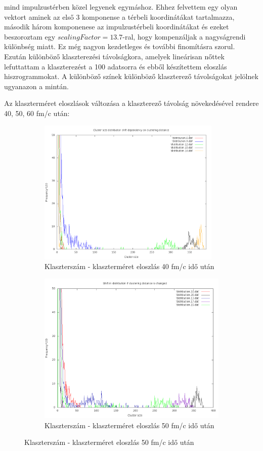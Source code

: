 \documentclass[a4paper,12pt]{article}
\begin{document}
mind impulzustérben közel legyenek egymáshoz. Ehhez felvettem egy olyan vektort aminek az első 3 komponense a térbeli koordinátákat tartalmazza,
második három komponenese az impulzustérbeli koordinátákat és ezeket beszoroztam egy $scalingFactor = 13.7$-ral, hogy kompenzáljak a nagyságrendi különbség
miatt. Ez még nagyon kezdetleges és további finomításra szorul. Ezután különböző klaszterezési távolságkora, amelyek lineárisan nőttek lefuttattam a klaszterezést a 100 adatsorra és ebből készítettem eloszlás
hiszrogrammokat. A különböző színek különböző klaszterező távolságokat jelölnek ugyanazon a mintán.
\par Az klaszterméret eloszlások változása a klaszterező távolság növekedésével rendere 40, 50, 60 fm/c után:
\begin{figure}[H]
	\centering
	\begin{subfigure}{.45\textwidth}
		\includegraphics[width=0.96\textwidth]{ShiftInDistro80.png}
		\caption{ Klaszterszám - klaszterméret eloszlás 40 fm/c idő után }
	\end{subfigure}
	\begin{subfigure}{.45\textwidth}
		\includegraphics[width=.96\textwidth]{ShiftInDistro100.png}
		\caption{ Klaszterszám - klaszterméret eloszlás 50 fm/c idő után} 
	\end{subfigure}
\end{figure}
\end{document}
